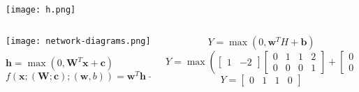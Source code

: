 %

\begin{frame}
\begin{center}
\texttt{[image: h.png]}
\end{center}
\end{frame}


\begin{frame}
\begin{columns}[t]
\begin{column}{.4\textwidth}
\begin{center}
\texttt{[image: network-diagrams.png]}
\end{center}
$
\textbf{h} = \max(0, \textbf{W}^{T}\textbf{x} + \textbf{c})
$\\
$
f(\textbf{x}; (\textbf{W}; \textbf{c}); (\textbf{w}, b)) = \textbf{w}^{T} \textbf{h} + b
$
\end{column}
\begin{column}{.6\textwidth}
\[
Y = \max
\left (
0,
\textbf{w}^T H + \textbf{b}
\right )
\]
\[
Y = \max
\left (
\left [
\begin{array}{cc}
1 & -2
\end{array}
\right ]
\left [
\begin{array}{cccc}
0 & 1 & 1 & 2 \\
0 & 0 & 0 & 1
\end{array}
\right ]
+
\left [
\begin{array}{c}
0 \\
0
\end{array}
\right ]
\right )
\]
\[
Y =
\left [
\begin{array}{cccc}
0 & 1 & 1 & 0
\end{array}
\right ]
\]
\end{column}
\end{columns}
\end{frame}








